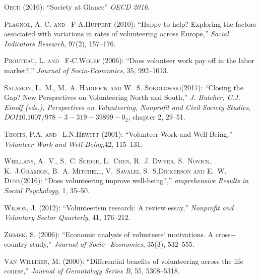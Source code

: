 \documentclass[10pt, letterpaper]{article}
\begin{document}
\begin{spacing}{1.4}
\begin{thebibliography}{87}
\textsc{Oecd} (2016): \enquote{Society at Glance} \emph{OECD 2016}.

\textsc{Plagnol, A. C. and ~F-A.Huppert } (2010): \enquote{Happy to help? Exploring the factors associated with variations in rates of volunteering across Europe,} \emph{Social Indicators Research}, 97(2), 157--176.
  
\textsc{Prouteau, L. and ~F-C.Wolff } (2006): \enquote{Does volunteer work pay off in the labor market?,} \emph{Journal of Socio-Economics}, 35, 992--1013.

 \textsc{Salamon, L.~M., M.~A. Haddock and W.~S. Sokolowski}(2017):
 \enquote{Closing the Gap? New Perspectives on Volunteering North and South,} \emph{J. Butcher, C.J. Einolf (eds.), Perspectives on Volunteering, Nonprofit and Civil Society Studies, $DOI 10.1007/978-3-319-39899-0_2$}, chapter 2, 29--51.
  
\textsc{Thoits, P.A. and ~L.N.Hewitt } (2001): \enquote{Volunteer Work and Well-Being,} \emph{Volunteer Work and Well-Being},42, 115--131.


\textsc{Whillans, A.~V., S.~C. Seider, L.~Chen, R.~J. Dwyer, S.~Novick, K.~J.Gramign, B.~A. Mitchell, V.~Savalei, S.~S.Dickerson and E.~W. Dunn}(2016):
  \enquote{Does volunteering improve well-being?,} \emph{omprehensive Results in Social Psychology}, 1, 35--50.

  
\textsc{Wilson, J.} (2012): \enquote{Volunteerism research: A
  review essay,} \emph{Nonprofit and Voluntary Sector Quarterly}, 41, 176--212.

\textsc{Ziemek, S.} (2006): \enquote{Economic analysis of volunteers` motivations. A cross$-$country study,} \emph{Journal of Socio$-$Economics}, 35(3), 532--555.


\textsc{Van Willigen, M.} (2000): \enquote{Differential benefits of volunteering across the life course,} \emph{Journal of Gerontology Series B}, 55, 5308--5318.



\end{thebibliography}
\end{spacing}
\end{document}
